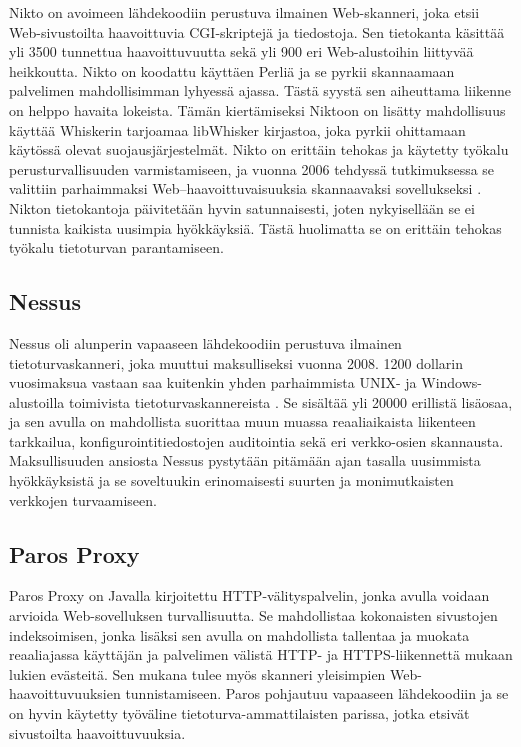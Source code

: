 Nikto \cite{Nikto} on avoimeen lähdekoodiin perustuva ilmainen Web-skanneri, joka etsii Web-sivustoilta haavoittuvia CGI-skriptejä ja tiedostoja. Sen tietokanta käsittää
yli 3500 tunnettua haavoittuvuutta sekä yli 900 eri Web-alustoihin liittyvää heikkoutta. Nikto on koodattu käyttäen Perliä ja se pyrkii skannaamaan palvelimen 
mahdollisimman lyhyessä ajassa. Tästä syystä sen aiheuttama liikenne on helppo havaita lokeista. Tämän kiertämiseksi Niktoon on lisätty mahdollisuus käyttää Whiskerin
tarjoamaa libWhisker kirjastoa, joka pyrkii ohittamaan käytössä olevat suojausjärjestelmät. Nikto on erittäin tehokas ja käytetty työkalu perusturvallisuuden 
varmistamiseen, ja vuonna 2006 tehdyssä tutkimuksessa se valittiin parhaimmaksi Web--haavoittuvaisuuksia skannaavaksi sovellukseksi \cite{INS}.
Nikton tietokantoja päivitetään hyvin satunnaisesti, joten nykyisellään se ei tunnista kaikista uusimpia hyökkäyksiä. Tästä huolimatta se on erittäin tehokas työkalu 
tietoturvan parantamiseen.

\subsection{Nessus}

Nessus \cite{Nessus} oli alunperin vapaaseen lähdekoodiin perustuva ilmainen tietoturvaskanneri, joka muuttui maksulliseksi vuonna 2008. 1200 dollarin vuosimaksua vastaan
saa kuitenkin yhden parhaimmista UNIX- ja Windows-alustoilla toimivista tietoturvaskannereista \cite{NST}. Se sisältää yli 20000 erillistä lisäosaa,
ja sen avulla on mahdollista suorittaa muun muassa reaaliaikaista liikenteen tarkkailua, konfigurointitiedostojen auditointia sekä eri verkko-osien skannausta. Maksullisuuden 
ansiosta Nessus pystytään pitämään ajan tasalla uusimmista hyökkäyksistä ja se soveltuukin erinomaisesti suurten ja monimutkaisten verkkojen turvaamiseen\cite{Nessus}. 

\subsection{Paros Proxy}

Paros Proxy \cite{Paros} on Javalla kirjoitettu HTTP-välityspalvelin, jonka avulla voidaan arvioida Web-sovelluksen turvallisuutta. Se mahdollistaa kokonaisten sivustojen indeksoimisen,
jonka lisäksi sen avulla on mahdollista tallentaa ja muokata reaaliajassa käyttäjän ja palvelimen välistä HTTP- ja HTTPS-liikennettä mukaan lukien evästeitä. Sen mukana tulee
myös skanneri yleisimpien Web-haavoittuvuuksien tunnistamiseen. Paros pohjautuu vapaaseen lähdekoodiin ja se on hyvin käytetty työväline tietoturva-\-ammattilaisten
parissa, jotka etsivät sivustoilta haavoittuvuuksia.

